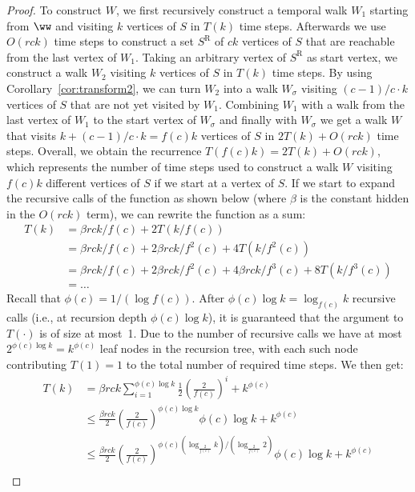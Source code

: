 \documentclass[10pt,a4paper]{article}
\begin{document}
{\begin{proof}
    To construct $W$, we first recursively construct a temporal walk $W_{1}$
    starting from $\ww$ and visiting $k$ vertices of $S$ in $T(k)$ time steps.
    Afterwards we use $O(rck)$ time steps to construct a set $S^{\mathrm{R}}$ of
    $ck$ vertices of $S$ that are reachable from the last vertex of
    $W_{1}$. Taking an arbitrary vertex of $S^{\mathrm{R}}$ as start
    vertex, we construct a walk {$W_{2}$} visiting $k$ vertices
    of $S$ in $T(k)$ time steps. By using Corollary~\ref{cor:transform2},
    we can turn {$W_{2}$} into a walk {$W_{\sigma}$} visiting
    $(c-1)/c \cdot k$ vertices of $S$ that are not yet visited by
    $W_{1}$. Combining $W_{1}$ with a walk from the last
    vertex of $W_{1}$ to the start vertex of
    {$W_{\sigma}$} and {finally} with {$W_{\sigma}$} we get a walk
    $W$ that visits $k+(c-1)/c \cdot k=f(c)k$ vertices of $S$ in $2T(k)+O(rck)$
    time steps. Overall, we obtain the recurrence $T(f(c)k)
    = 2T(k)+O(rck)$, which represents the number of time steps used to construct a
    walk $W$ visiting $f(c)k$ different vertices of $S$ if we start at a vertex
    of $S$. If we start to expand the recursive calls of the function as shown
    below (where $\beta$ is the constant hidden in the $O(rck)$ term), we can
    rewrite the function as a sum:
    \begin{align*} 
        T(k)    &= \beta rck/f(c) + 2T(k/f(c))\\ 
                &=  \beta rck/f(c) + 2\beta rck/f^2(c) + 4T(k/f^2(c))\\ 
                &=  \beta rck/f(c) + 2\beta rck/f^2(c) + 4\beta rck/f^3(c) + 8T(k/f^3(c))\\ 
                &= \ldots
    \end{align*}
    Recall that $\phi(c)=1/(\log {f(c)})$. After $\phi(c) \log k=\log_{f(c)} k$ recursive
    calls (i.e., at recursion depth $\phi(c)\log k$), it is guaranteed that the argument to $T(\cdot)$ is of size at
    most~1. Due to the number of recursive calls we have at most $2^{\phi(c)\log k}=
    k^{\phi(c)}$
    leaf nodes in the recursion tree, with each such node contributing $T(1)=1$
    to the total number of required time steps. We then get:
    \begin{align*} 
        T(k)    &= \beta rck \sum_{i=1}^{\phi(c)\log k} \frac{1}{2}(\frac{2}{f(c)})^{i} + k^{\phi(c)}\\ 
                &\leq \frac{\beta rck}{2} (\frac{2}{f(c)})^{\phi(c) \log k}\phi(c)\log k + k^{\phi(c)}\\ 
                &\leq \frac{\beta rck}{2} (\frac{2}{f(c)})^{\phi(c) (\log_{\frac{2}{f(c)}} k) / (\log_{\frac{2}{f(c)}} 2)}\phi(c)\log k + k^{\phi(c)}\\ 

\end{align*}
\end{proof}}
\end{document}
